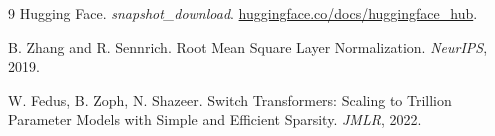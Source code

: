 \documentclass[11pt,a4paper]{article}
\newcommand{\1}{\mathbf{1}}
\theoremstyle{plain}
\begin{document}

\begin{thebibliography}{9}
  Hugging Face.
  \newblock \emph{snapshot\_download}.
  \newblock \href{https://huggingface.co/docs/huggingface_hub/en/package_reference/mixins#huggingface_hub.snapshot_download}{huggingface.co/docs/huggingface\_hub}.

  B. Zhang and R. Sennrich.
  \newblock Root Mean Square Layer Normalization.
  \newblock \emph{NeurIPS}, 2019.

  W. Fedus, B. Zoph, N. Shazeer.
  \newblock Switch Transformers: Scaling to Trillion Parameter Models with Simple and Efficient Sparsity.
  \newblock \emph{JMLR}, 2022.
\end{thebibliography}
\end{document}
